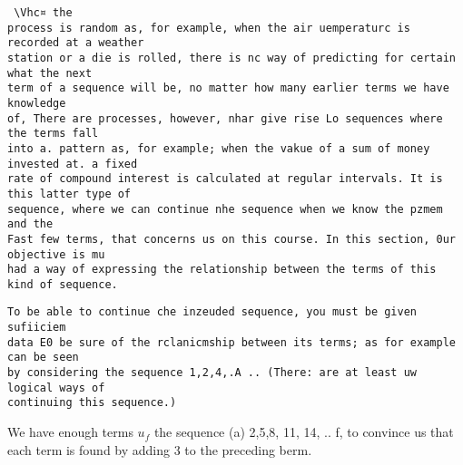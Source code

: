 \documentclass[]{article}
\begin{document}
\begin{verbatim}
 \Vhc¤ the
process is random as, for example, when the air uemperaturc is recorded at a weather
station or a die is rolled, there is nc way of predicting for certain what the next
term of a sequence will be, no matter how many earlier terms we have knowledge
of, There are processes, however, nhar give rise Lo sequences where the terms fall
into a. pattern as, for example; when the vakue of a sum of money invested at. a fixed
rate of compound interest is calculated at regular intervals. It is this latter type of
sequence, where we can continue nhe sequence when we know the pzmem and the
Fast few terms, that concerns us on this course. In this section, 0ur objective is mu
had a way of expressing the relationship between the terms of this kind of sequence.
\end{verbatim}
\begin{verbatim}
To be able to continue che inzeuded sequence, you must be given sufiiciem
data E0 be sure of the rclanicmship between its terms; as for example can be seen
by considering the sequence 1,2,4,.A .. (There: are at least uw logical ways of
continuing this sequence.)
\end{verbatim}

We have enough terms $u_f$ the sequence (a) 2,5,8, 11, 14, .. f, to convince us that
each term is found by adding 3 to the preceding berm. 
\end{document}
